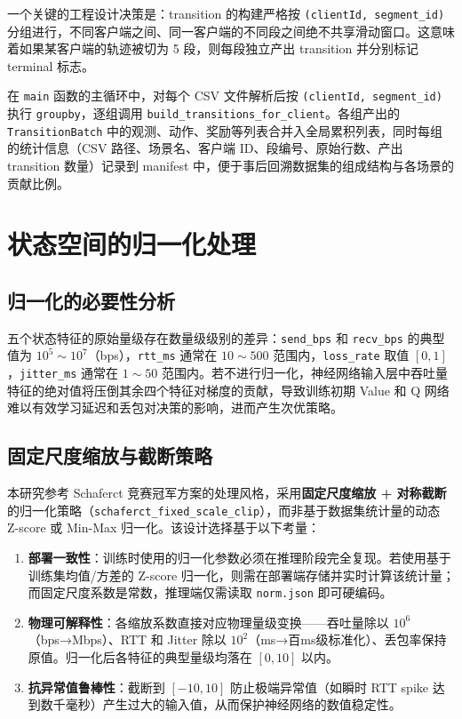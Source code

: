一个关键的工程设计决策是：transition 的构建严格按 \texttt{(clientId, segment\_id)} 分组进行，不同客户端之间、同一客户端的不同段之间绝不共享滑动窗口。这意味着如果某客户端的轨迹被切为 5 段，则每段独立产出 transition 并分别标记 terminal 标志。

在 \texttt{main} 函数的主循环中，对每个 CSV 文件解析后按 \texttt{(clientId, segment\_id)} 执行 \texttt{groupby}，逐组调用 \texttt{build\_transitions\_for\_client}。各组产出的 \texttt{TransitionBatch} 中的观测、动作、奖励等列表合并入全局累积列表，同时每组的统计信息（CSV 路径、场景名、客户端 ID、段编号、原始行数、产出 transition 数量）记录到 manifest 中，便于事后回溯数据集的组成结构与各场景的贡献比例。

\section{状态空间的归一化处理}

\subsection{归一化的必要性分析}

五个状态特征的原始量级存在数量级级别的差异：\texttt{send\_bps} 和 \texttt{recv\_bps} 的典型值为 $10^5 \sim 10^7$（bps），\texttt{rtt\_ms} 通常在 $10 \sim 500$ 范围内，\texttt{loss\_rate} 取值 $[0, 1]$，\texttt{jitter\_ms} 通常在 $1 \sim 50$ 范围内。若不进行归一化，神经网络输入层中吞吐量特征的绝对值将压倒其余四个特征对梯度的贡献，导致训练初期 Value 和 Q 网络难以有效学习延迟和丢包对决策的影响，进而产生次优策略。

\subsection{固定尺度缩放与截断策略}

本研究参考 Schaferct 竞赛冠军方案的处理风格，采用\textbf{固定尺度缩放 + 对称截断}的归一化策略（\texttt{schaferct\_fixed\_scale\_clip}），而非基于数据集统计量的动态 Z-score 或 Min-Max 归一化。该设计选择基于以下考量：

\begin{enumerate}
    \item \textbf{部署一致性}：训练时使用的归一化参数必须在推理阶段完全复现。若使用基于训练集均值/方差的 Z-score 归一化，则需在部署端存储并实时计算该统计量；而固定尺度系数是常数，推理端仅需读取 \texttt{norm.json} 即可硬编码。
    \item \textbf{物理可解释性}：各缩放系数直接对应物理量级变换——吞吐量除以 $10^6$（bps→Mbps）、RTT 和 Jitter 除以 $10^2$（ms→百ms级标准化）、丢包率保持原值。归一化后各特征的典型量级均落在 $[0, 10]$ 以内。
    \item \textbf{抗异常值鲁棒性}：截断到 $[-10, 10]$ 防止极端异常值（如瞬时 RTT spike 达到数千毫秒）产生过大的输入值，从而保护神经网络的数值稳定性。
\end{enumerate}

